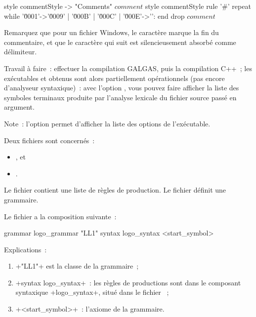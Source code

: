 \begin{galgas3}
style commentStyle -> "Comments"
$comment$ style commentStyle %
rule '#' {
  repeat
  while '\u0001'->'\u0009' | '\u000B' | '\u000C' | '\u000E'->'\uFFFD':
  end
  drop $comment$
}
\end{galgas3}

Remarquez que pour un fichier Windows, le caractère  marque la fin du commentaire, et que le caractère  qui suit est silencieusement absorbé comme délimiteur.

Travail à faire~: effectuer la compilation GALGAS, puis la compilation C++~; les exécutables  et  obtenus sont alors partiellement opérationnels (pas encore d’analyseur syntaxique)~: avec l'option , vous pouvez faire afficher la liste des symboles terminaux produite par l'analyse lexicale du fichier source passé en argument.

Note~: l'option  permet d'afficher la liste des options de l'exécutable.


Deux fichiers sont concernés~:
\begin{itemize}
  \item {}, et
  \item {}.
\end{itemize}

Le fichier  contient une liste de règles de production. Le fichier  définit une grammaire.

Le fichier  a la composition suivante~:

\begin{galgas3}
grammar logo_grammar "LL1" {
  syntax logo_syntax
  <start_symbol>
}
\end{galgas3}

Explications~:
\begin{enumerate}
  \item \ggst+"LL1"+ est la classe de la grammaire~;
  \item \ggst+syntax logo_syntax+~: les règles de productions sont dans le composant syntaxique \ggst+logo_syntax+, situé dans le fichier ~;
  \item \ggst+<start_symbol>+~: l'axiome de la grammaire.
\end{enumerate}

